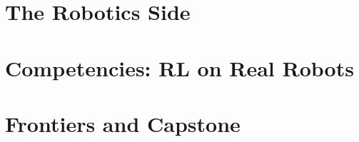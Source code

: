 \documentclass[11pt, twoside, openright]{book}
\begin{document}
\part{The Robotics Side}






\part{Competencies: RL on Real Robots}




\part{Frontiers and Capstone}


\end{document}
